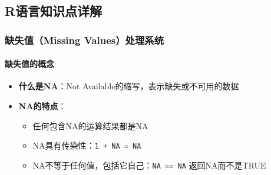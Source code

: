 \documentclass[
  twoside]{book}
\newenvironment{Shaded}{\begin{snugshade}}{\end{snugshade}}
\newcommand{\CommentTok}[1]{\textcolor[rgb]{0.56,0.35,0.01}{\textit{#1}}}
\newcommand{\ConstantTok}[1]{\textcolor[rgb]{0.56,0.35,0.01}{#1}}
\newcommand{\DecValTok}[1]{\textcolor[rgb]{0.00,0.00,0.81}{#1}}
\newcommand{\FunctionTok}[1]{\textcolor[rgb]{0.13,0.29,0.53}{\textbf{#1}}}
\newcommand{\NormalTok}[1]{#1}
\newcommand{\OtherTok}[1]{\textcolor[rgb]{0.56,0.35,0.01}{#1}}
\newcommand{\SpecialCharTok}[1]{\textcolor[rgb]{0.81,0.36,0.00}{\textbf{#1}}}
\providecommand{\tightlist}{%
  \setlength{\itemsep}{0pt}\setlength{\parskip}{0pt}}
\begin{document}
\begin{Shaded}
\end{Shaded}

\hypertarget{rux8bedux8a00ux77e5ux8bc6ux70b9ux8be6ux89e3-5}{%
\subsection{R语言知识点详解}\label{rux8bedux8a00ux77e5ux8bc6ux70b9ux8be6ux89e3-5}}

\hypertarget{ux7f3aux5931ux503cmissing-valuesux5904ux7406ux7cfbux7edf}{%
\subsubsection{缺失值（Missing Values）处理系统}\label{ux7f3aux5931ux503cmissing-valuesux5904ux7406ux7cfbux7edf}}

\hypertarget{ux7f3aux5931ux503cux7684ux6982ux5ff5}{%
\paragraph{缺失值的概念}\label{ux7f3aux5931ux503cux7684ux6982ux5ff5}}

\begin{itemize}
\tightlist
\item
  \textbf{什么是NA}：Not Available的缩写，表示缺失或不可用的数据
\item
  \textbf{NA的特点}：

  \begin{itemize}
  \tightlist
  \item
    任何包含NA的运算结果都是NA
  \item
    NA具有传染性：\texttt{1\ +\ NA\ =\ NA}
  \item
    NA不等于任何值，包括它自己：\texttt{NA\ ==\ NA} 返回NA而不是TRUE
  \end{itemize}
\end{itemize}
\end{document}
